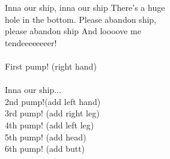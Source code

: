 
Inna our ship, inna our ship There's a huge \\ hole in the bottom. Please abandon ship, \\ please abandon ship And loooove me \\ tendeeeeeeeer! \\ \hspace{10mm} \\ First pump! (right hand) \\ \hspace{10mm} \\ Inna our ship... \\ 2nd pump!(add left hand) \\ 3rd pump! (add right leg) \\ 4th pump! (add left leg) \\ 5th pump! (add head) \\ 6th pump! (add butt)